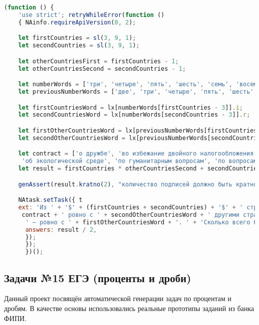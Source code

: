 \begin{lstlisting}[language=JavaScript]
(function () { 
    'use strict'; retryWhileError(function ()
    { NAinfo.requireApiVersion(0, 2);

    let firstCountries = sl(3, 9, 1);
    let secondCountries = sl(3, 9, 1);

    let otherCountriesFirst = firstCountries - 1;
    let otherCountriesSecond = secondCountries - 1;

    let numberWords = ['три', 'четыре', 'пять', 'шесть', 'семь', 'восемь', 'девять'];
    let previousNumberWords = ['две', 'три', 'четыре', 'пять', 'шесть', 'семь', 'восемь'];

    let firstCountriesWord = lx[numberWords[firstCountries - 3]].i; 
    let secondCountriesWord = lx[numberWords[secondCountries - 3]].r;

    let firstOtherCountriesWord = lx[previousNumberWords[firstCountries - 3]].t; 
    let secondOtherCountriesWord = lx[previousNumberWords[secondCountries - 3]].t; 

    let contract = ['о дружбе', 'во избежание двойного налогообложения', 'о безвизовом режиме',
     'об экологической среде', 'по гуманитарным вопросам', 'по вопросам безопасности'].iz();
    let result = firstCountries * otherCountriesSecond + secondCountries * otherCountriesFirst; 

    genAssert(result.kratno(2), "количество подписей должно быть кратно двум"); 

    NAtask.setTask({ t
    ext: 'Из ' + '$' + (firstCountries + secondCountries) + '$' + ' стран ' + firstCountriesWord + ' подписали договор ' +
     contract + ' ровно с ' + secondOtherCountriesWord + ' другими странами, ' + 'а каждая из оставшихся ' + secondCountriesWord +
      ' — ровно с ' + firstOtherCountriesWord + '. ' + 'Сколько всего было подписано договоров?', 
      answers: result / 2, 
      }); 
      }); 
      })();
\end{lstlisting}

\subsection{Задачи №15 ЕГЭ (проценты и дроби)}

Данный проект посвящён автоматической генерации задач по процентам и дробям. 
В качестве основы использовались реальные прототипы заданий из банка ФИПИ.

